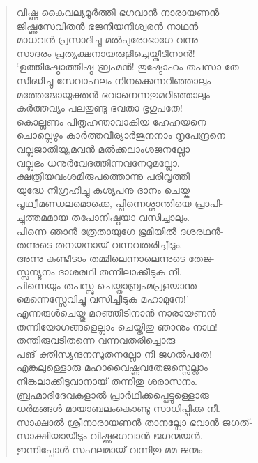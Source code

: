 \begin{verse}
വിഷ്ണു കൈവല്യമൂര്‍ത്തി ഭഗവാന്‍ നാരായണന്‍\\
ജിഷ്ണുസേവിതന്‍ ഭജനീയനീശ്വരന്‍ നാഥന്‍\\
മാധവന്‍ പ്രസാദിച്ചു മല്‍പുരോഭാഗേ വന്നു\\
സാദരം പ്രത്യക്ഷനായരുളിച്ചെയ്തീടിനാന്‍!\\
‘ഉത്തിഷ്ഠോത്തിഷ്ഠ ബ്രഹ്മന്‍! തുഷ്ടോഹം തപസാ തേ\\
സിദ്ധിച്ചു സേവാഫലം നിനക്കെന്നറിഞ്ഞാലും\\
മത്തേജോയുക്തന്‍ ഭവാനെന്നതുമറിഞ്ഞാലും\\
കര്‍ത്തവ്യം പലതുണ്ടു ഭവതാ ഭൃഗുപതേ!\\
കൊല്ലണം പിതൃഹന്താവാകിയ ഹേഹയനെ\\
ചൊല്ലെഴും കാര്‍ത്തവീര്യാര്‍ജുനനാം നൃപേന്ദ്രനെ\\
വല്ലജാതിയു,മവന്‍ മല്‍ക്കലാംശജനല്ലോ\\
വല്ലഭം ധനുര്‍വേദത്തിന്നവനേറുമല്ലോ.\\
ക്ഷത്രിയവംശമിരുപത്തൊന്നു പരിവൃത്തി\\
യുദ്ധേ നിഗ്രഹിച്ചു കശ്യപനു ദാനം ചെയ്ക\\
പൃഥ്വീമണ്ഡലമൊക്കെ, പ്പിന്നെശ്ശാന്തിയെ പ്രാപി-\\
ച്ചുത്തമമായ തപോനിഷ്ഠയാ വസിച്ചാലും.\\
പിന്നെ ഞാന്‍ ത്രേതായുഗേ ഭൂമിയില്‍ ദശരഥന്‍-\\
തന്നുടെ തനയനായ് വന്നവതരിച്ചീടും.\\
അന്നു കണ്ടീടാം തമ്മിലെന്നാലെന്നുടെ തേജ-\\
സ്സന്യൂനം ദാശരഥി തന്നിലാക്കീടുക നീ.\\
പിന്നെയും തപസ്സു ചെയ്താബ്രഹ്മപ്രളയാന്ത-\\
മെന്നെസ്സേവിച്ചു വസിച്ചീടുക മഹാമുനേ!’\\
എന്നരുള്‍ചെയ്തു മറഞ്ഞീടിനാന്‍ നാരായണന്‍\\
തന്നിയോഗങ്ങളെല്ലാം ചെയ്തിതു ഞാനും നാഥ!\\
തന്തിരുവടിതന്നെ വന്നവതരിച്ചൊരു\\
പങ് ക്തിസ്യന്ദനസുതനല്ലോ നീ ജഗല്‍പതേ!\\
എങ്കലുള്ളൊരു മഹാവൈഷ്ണവതേജസ്സെല്ലാം\\
നിങ്കലാക്കീടുവാനായ് തന്നിതു ശരാസനം.\\
ബ്രഹ്മാദിദേവകളാല്‍ പ്രാര്‍ഥിക്കപ്പെട്ടുള്ളൊരു\\
ധര്‍മങ്ങള്‍ മായാബലംകൊണ്ടു സാധിപ്പിക്ക നീ.\\
സാക്ഷാല്‍ ശ്രീനാരായണന്‍ താനല്ലോ ഭവാന്‍ ജഗത്-\\
സാക്ഷിയായീടും വിഷ്ണുഭഗവാന്‍ ജഗന്മയന്‍.\\
ഇന്നിപ്പോള്‍ സഫലമായ് വന്നിതു മമ ജന്മം\\

\end{verse}
